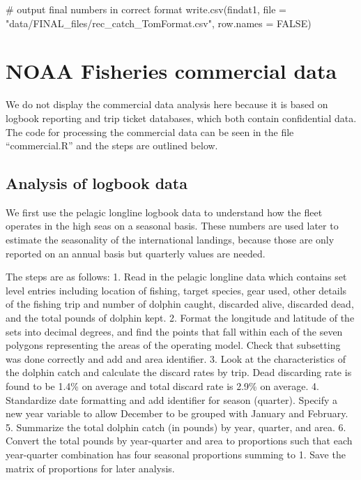\documentclass[
  letterpaper,
  oneside,
  open=any]{scrbook}
\newenvironment{Shaded}{\begin{snugshade}}{\end{snugshade}}
\newcommand{\AttributeTok}[1]{\textcolor[rgb]{0.40,0.45,0.13}{#1}}
\newcommand{\CommentTok}[1]{\textcolor[rgb]{0.37,0.37,0.37}{#1}}
\newcommand{\ConstantTok}[1]{\textcolor[rgb]{0.56,0.35,0.01}{#1}}
\newcommand{\FunctionTok}[1]{\textcolor[rgb]{0.28,0.35,0.67}{#1}}
\newcommand{\NormalTok}[1]{\textcolor[rgb]{0.00,0.23,0.31}{#1}}
\newcommand{\StringTok}[1]{\textcolor[rgb]{0.13,0.47,0.30}{#1}}
\begin{document}
\begin{Shaded}
\begin{Highlighting}[]
\CommentTok{\# output final numbers in correct format}
\FunctionTok{write.csv}\NormalTok{(findat1, }\AttributeTok{file =} \StringTok{"data/FINAL\_files/rec\_catch\_TomFormat.csv"}\NormalTok{, }\AttributeTok{row.names =} \ConstantTok{FALSE}\NormalTok{)}
\end{Highlighting}
\end{Shaded}


\chapter{NOAA Fisheries commercial
data}\label{noaa-fisheries-commercial-data}

We do not display the commercial data analysis here because it is based
on logbook reporting and trip ticket databases, which both contain
confidential data. The code for processing the commercial data can be
seen in the file ``commercial.R'' and the steps are outlined below.

\section{Analysis of logbook data}\label{analysis-of-logbook-data}

We first use the pelagic longline logbook data to understand how the
fleet operates in the high seas on a seasonal basis. These numbers are
used later to estimate the seasonality of the international landings,
because those are only reported on an annual basis but quarterly values
are needed.

The steps are as follows: 1. Read in the pelagic longline data which
contains set level entries including location of fishing, target
species, gear used, other details of the fishing trip and number of
dolphin caught, discarded alive, discarded dead, and the total pounds of
dolphin kept. 2. Format the longitude and latitude of the sets into
decimal degrees, and find the points that fall within each of the seven
polygons representing the areas of the operating model. Check that
subsetting was done correctly and add and area identifier. 3. Look at
the characteristics of the dolphin catch and calculate the discard rates
by trip. Dead discarding rate is found to be 1.4\% on average and total
discard rate is 2.9\% on average. 4. Standardize date formatting and add
identifier for season (quarter). Specify a new year variable to allow
December to be grouped with January and February. 5. Summarize the total
dolphin catch (in pounds) by year, quarter, and area. 6. Convert the
total pounds by year-quarter and area to proportions such that each
year-quarter combination has four seasonal proportions summing to 1.
Save the matrix of proportions for later analysis.
\end{document}
